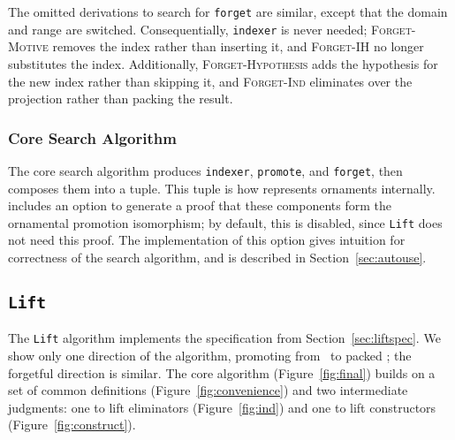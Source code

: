 The omitted derivations to search for \lstinline{forget} are similar,
except that the domain and range are switched. Consequentially, \lstinline{indexer} is never needed;
\textsc{Forget-Motive} removes the index rather than inserting it, and \textsc{Forget-IH} no longer substitutes the index.
Additionally, \textsc{Forget-Hypothesis} adds the hypothesis for the new index
rather than skipping it, and \textsc{Forget-Ind} eliminates over the projection rather than packing the result. %

\subsubsection{Core Search Algorithm} The core search algorithm produces \lstinline{indexer},
\lstinline{promote}, and \lstinline{forget}, then composes them into a tuple. This tuple is how \toolnameb represents ornaments internally.
\toolnameb includes an option to generate a proof that these components form the ornamental promotion isomorphism;
by default, this is disabled, since \lstinline{Lift} does not need this proof. The implementation of this option 
gives intuition for correctness of the search algorithm, and is described in Section~\ref{sec:autouse}.

\subsection{\lstinline{Lift}}
\label{sec:liftalg}

The \lstinline{Lift} algorithm implements the specification from Section~\ref{sec:liftspec}.
We show only one direction of the algorithm, promoting 
from \Aa\ to packed \B; the forgetful direction is similar.
The core algorithm (Figure~\ref{fig:final}) builds on a set of common definitions (Figure~\ref{fig:convenience}) and 
two intermediate judgments: one to lift eliminators (Figure~\ref{fig:ind}) and one to lift constructors (Figure~\ref{fig:construct}).

